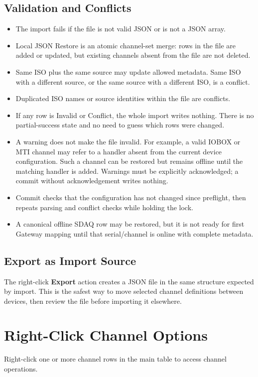 \documentclass[11pt,a4paper]{article}
\begin{document}
\subsection{Validation and Conflicts}
\begin{itemize}
\item The import fails if the file is not valid JSON or is not a JSON array.
\item Local JSON Restore is an atomic channel-set merge: rows in the file are added or updated, but existing channels absent from the file are not deleted.
\item Same ISO plus the same source may update allowed metadata. Same ISO with a different source, or the same source with a different ISO, is a conflict.
\item Duplicated ISO names or source identities within the file are conflicts.
\item If any row is Invalid or Conflict, the whole import writes nothing. There is no partial-success state and no need to guess which rows were changed.
\item A warning does not make the file invalid. For example, a valid IOBOX or MTI channel may refer to a handler absent from the current device configuration. Such a channel can be restored but remains offline until the matching handler is added. Warnings must be explicitly acknowledged; a commit without acknowledgement writes nothing.
\item Commit checks that the configuration has not changed since preflight, then repeats parsing and conflict checks while holding the lock.
\item A canonical offline SDAQ row may be restored, but it is not ready for first Gateway mapping until that serial/channel is online with complete metadata.
\end{itemize}

\subsection{Export as Import Source}
The right-click \textbf{Export} action creates a JSON file in the same structure expected by import. This is the safest way to move selected channel definitions between devices, then review the file before importing it elsewhere.

\section{Right-Click Channel Options}
Right-click one or more channel rows in the main table to access channel operations.
\end{document}
